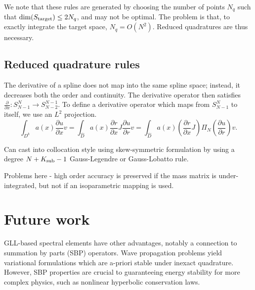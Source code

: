 \documentclass{siamart0216}
\newcommand{\pd}[2]{\frac{\partial#1}{\partial#2}}
\newcommand{\LRp}[1]{\left( #1 \right)}
\begin{document}
We note that these rules are generated by choosing the number of points $N_q$ such that ${\rm dim}(S_{\rm target}) \leq 2N_q$, and may not be optimal.  The problem is that, to exactly integrate the target space, $N_q = O(N^2)$.  Reduced quadratures are thus necessary.  

\subsection{Reduced quadrature rules}

The derivative of a spline does not map into the same spline space; instead, it decreases both the order and continuity.  The derivative operator then satisfies $\pd{}{x} : S^N_{N-1}\rightarrow S^{N-1}_{N-2}$.  To define a derivative operator which maps from $S^N_{N-1}$ to itself, we use an $L^2$ projection.  
\[
\int_{D^k} a(x)\pd{u}{x} v = \int_{\widehat{D}} a(x)\pd{r}{x}J\pd{u}{r} v = \int_{\widehat{D}} a(x)\LRp{\pd{r}{x}J} \Pi_N\LRp{\pd{u}{r}} v.  
\]

Can cast into collocation style using skew-symmetric formulation by using a degree $N + K_{\rm sub} - 1$ Gauss-Legendre or Gauss-Lobatto rule.  

Problems here - high order accuracy is preserved if the mass matrix is under-integrated, but not if an isoparametric mapping is used.  


\section{Future work}

GLL-based spectral elements have other advantages, notably a connection to summation by parts (SBP) operators.  Wave propagation problems yield variational formulations which are a-priori stable under inexact quadrature.  However, SBP properties are crucial to guaranteeing energy stability for more complex physics, such as nonlinear hyperbolic conservation laws.  



\end{document}
